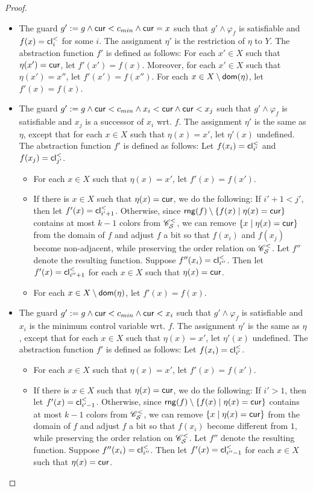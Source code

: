 \begin{appendix}
\begin{proof}
\begin{itemize}
\begin{itemize}
\item The guard $g' := g \wedge \mathsf{cur} < c_{min} \wedge \mathsf{cur} = x$ such that $g' \wedge \varphi_f$ is satisfiable and $f(x)=\mathsf{cl}^{<}_i$ for some $i$.  The assignment $\eta'$ is the restriction of  $\eta$ to $Y$. The abstraction function $f'$ is defined as follows: For each $x' \in X$ such that $\eta(x')=\mathsf{cur}$, let $f'(x')=f(x)$. Moreover, for each $x' \in X$ such that $\eta(x')=x''$, let $f'(x')=f(x'')$. For each $x \in X \setminus \mathsf{dom}(\eta)$, let $f'(x)=f(x)$.

\item The guard $g': = g \wedge \mathsf{cur} < c_{min} \wedge  x_i < \mathsf{cur} \wedge \mathsf{cur} < x_j$ such that $g' \wedge \varphi_f$ is satisfiable and $x_j$ is a successor of $x_i$ wrt. $f$. The assignment $\eta'$ is the same as $\eta$, except that for each $x \in X$ such that $\eta(x)=x'$, let $\eta'(x)$ undefined.  The abstraction function $f'$ is defined as follows: Let $f(x_i)=\mathsf{cl}^{<}_{i'}$ and $f(x_j)=\mathsf{cl}^{<}_{j'}$. 
\begin{itemize}
\item For each $x \in X$ such that $\eta(x)=x'$, let $f'(x)=f(x')$.
%
\item If there is $x \in X$ such that $\eta(x)=\mathsf{cur}$, we do the following: If $i'+1 < j'$, then let $f'(x)= \mathsf{cl}^{<}_{i'+1}$. Otherwise, since $\mathsf{rng}(f) \setminus \{f(x) \mid \eta(x)=\mathsf{cur}\}$ contains at most $k-1$ colors from $\mathscr{C}^<_{\mathcal{S} }$,  we can remove $\{x\mid \eta(x)=\mathsf{cur}\}$ from the domain of $f$ and adjust $f$ a bit so that $f(x_i)$ and $f(x_j)$ become non-adjacent, while preserving the order relation on $\mathscr{C}^<_{\mathcal{S} }$. Let $f''$ denote the resulting function. Suppose $f''(x_i)=\mathsf{cl}^<_{i''}$. Then let $f'(x)=\mathsf{cl}^<_{i''+1}$  for each $x \in X$ such that $\eta(x)=\mathsf{cur}$.
%
\item For each $x \in X \setminus \mathsf{dom}(\eta)$, let $f'(x)=f(x)$. 
\end{itemize}

\item The guard $g' := g \wedge \mathsf{cur} < c_{min} \wedge  \mathsf{cur} < x_i$ such that $g' \wedge \varphi_f$ is satisfiable and $x_i$ is the minimum control variable wrt. $f$. The assignment $\eta'$ is the same as $\eta$, except that for each $x \in X$ such that $\eta(x)=x'$, let $\eta'(x)$ undefined.  The abstraction function $f'$ is defined as follows: Let $f(x_i)=\mathsf{cl}^<_{i'}$.
\begin{itemize}
\item For each $x \in X$ such that $\eta(x)=x'$, let $f'(x)=f(x')$.
%
\item If there is $x \in X$ such that $\eta(x)=\mathsf{cur}$, we do the following: If $i' > 1$, then let $f'(x)= \mathsf{cl}^{<}_{i'-1}$. Otherwise, since $\mathsf{rng}(f) \setminus \{f(x) \mid \eta(x)=\mathsf{cur}\}$ contains at most $k-1$ colors from $\mathscr{C}^<_{\mathcal{S} }$,  we can remove $\{x \mid \eta(x)=\mathsf{cur}\}$ from the domain of $f$ and adjust $f$ a bit so that $f(x_i)$ become different from $1$, while preserving the order relation on $\mathscr{C}^<_{\mathcal{S} }$. Let $f''$ denote the resulting function. Suppose $f''(x_i)=\mathsf{cl}^<_{i''}$. Then let $f'(x)=\mathsf{cl}^<_{i''-1}$ for each $x \in X$ such that $\eta(x)=\mathsf{cur}$. 


\end{itemize}
\end{itemize}
\end{itemize}
\end{proof}
\end{appendix}
